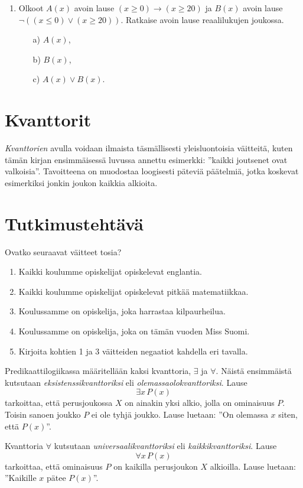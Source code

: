 \begin{enumerate}
\item
Olkoot $A(x)$ avoin lause $(x \ge 0) \to (x \ge 20)$
ja $B(x)$ avoin lause $\lnot ((x \le 0) \lor (x \ge 20))$. Ratkaise avoin lause reaalilukujen joukossa.
\begin{itemize}
\item[a)] $A(x)$,
\item[b)] $B(x)$,
\item[c)] $A(x) \lor B(x)$.
\end{itemize}

\end{enumerate}



\newpage

\section{Kvanttorit}
{\em Kvanttorien} avulla voidaan ilmaista täsmällisesti yleisluontoisia väitteitä, kuten tämän kirjan ensimmäisessä luvussa annettu esimerkki: ''kaikki joutsenet ovat valkoisia''. Tavoitteena on muodostaa loogisesti päteviä päätelmiä, jotka koskevat esimerkiksi jonkin joukon kaikkia alkioita.

\section*{Tutkimustehtävä}
Ovatko seuraavat väitteet tosia?
\begin{enumerate}
\item Kaikki koulumme opiskelijat opiskelevat englantia.
\item Kaikki koulumme opiskelijat opiskelevat pitkää matematiikkaa.
\item Koulussamme on opiskelija, joka harrastaa kilpaurheilua.
\item Koulussamme on opiskelija, joka on tämän vuoden Miss Suomi.
\item Kirjoita kohtien 1 ja 3 väitteiden negaatiot kahdella eri tavalla. 
\end{enumerate}

Predikaattilogiikassa määritellään kaksi kvanttoria, $\exists$ ja $\forall$. Näistä ensimmäistä kutsutaan {\em eksistenssikvanttoriksi} eli {\em olemassaolokvanttoriksi}. Lause
\[
\exists x\, P(x)
\]
tarkoittaa, että perusjoukossa $X$ on ainakin yksi alkio, jolla on ominaisuus $P$. Toisin sanoen joukko $P$ ei ole tyhjä joukko. Lause luetaan: ''On olemassa $x$ siten, että $P(x)$''.

Kvanttoria $\forall$ kutsutaan {\em universaalikvanttoriksi} eli {\em kaikkikvanttoriksi}. Lause
\[
\forall x\, P(x)
\]
tarkoittaa, että ominaisuus $P$ on kaikilla perusjoukon $X$ alkioilla. Lause luetaan: ''Kaikille $x$ pätee $P(x)$''.

